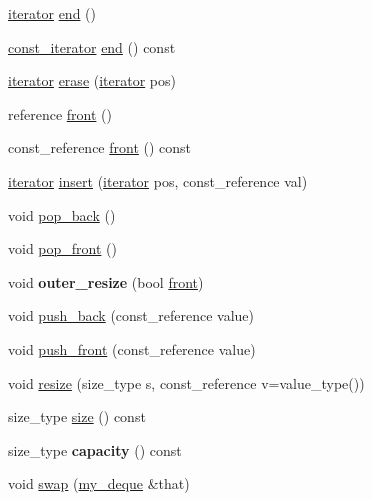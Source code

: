 \begin{DoxyCompactItemize}
\hyperlink{classmy__deque_1_1iterator}{iterator} \hyperlink{classmy__deque_a2576ee71790ebe55ac4200c506540bb5}{end} ()
\item 
\hyperlink{classmy__deque_1_1const__iterator}{const\-\_\-iterator} \hyperlink{classmy__deque_af465c3f8483634e4e656d90f8d0d88fb}{end} () const 
\item 
\hyperlink{classmy__deque_1_1iterator}{iterator} \hyperlink{classmy__deque_ad63482ee6a158a0029bed9cacfeb5dba}{erase} (\hyperlink{classmy__deque_1_1iterator}{iterator} pos)
\item 
reference \hyperlink{classmy__deque_a0eae28af0ffdd813d1f94f57d393fdf8}{front} ()
\item 
const\-\_\-reference \hyperlink{classmy__deque_a0f1239043b7339b8237a0c8bc663be6b}{front} () const 
\item 
\hyperlink{classmy__deque_1_1iterator}{iterator} \hyperlink{classmy__deque_a27f7317e3da46b7683d83ff9c06b5b59}{insert} (\hyperlink{classmy__deque_1_1iterator}{iterator} pos, const\-\_\-reference val)
\item 
void \hyperlink{classmy__deque_a63cc9691ee90701693e948246311c498}{pop\-\_\-back} ()
\item 
void \hyperlink{classmy__deque_a85c322cdc4f629e44abdcf369fdd3dab}{pop\-\_\-front} ()
\item 
\hypertarget{classmy__deque_afe5c284c1dd80bccdab048abf881d4c3}{void {\bfseries outer\-\_\-resize} (bool \hyperlink{classmy__deque_a0eae28af0ffdd813d1f94f57d393fdf8}{front})}\label{classmy__deque_afe5c284c1dd80bccdab048abf881d4c3}

\item 
void \hyperlink{classmy__deque_a08ee743a74c20baaf51559b06e2ff9a6}{push\-\_\-back} (const\-\_\-reference value)
\item 
void \hyperlink{classmy__deque_a815ce577d63d3cf3f4645d6fabc8d3b0}{push\-\_\-front} (const\-\_\-reference value)
\item 
void \hyperlink{classmy__deque_a80369f549dcd0a2ea9bc086fc97c8e25}{resize} (size\-\_\-type s, const\-\_\-reference v=value\-\_\-type())
\item 
size\-\_\-type \hyperlink{classmy__deque_a3100498f22d2dfa480b141f8ef7990ca}{size} () const 
\item 
\hypertarget{classmy__deque_a6402ba96543ef0e121dc72e4429b048f}{size\-\_\-type {\bfseries capacity} () const }\label{classmy__deque_a6402ba96543ef0e121dc72e4429b048f}

\item 
void \hyperlink{classmy__deque_a50f83432394d6d068d4d96a3515d7b79}{swap} (\hyperlink{classmy__deque}{my\-\_\-deque} \&that)
\end{DoxyCompactItemize}
